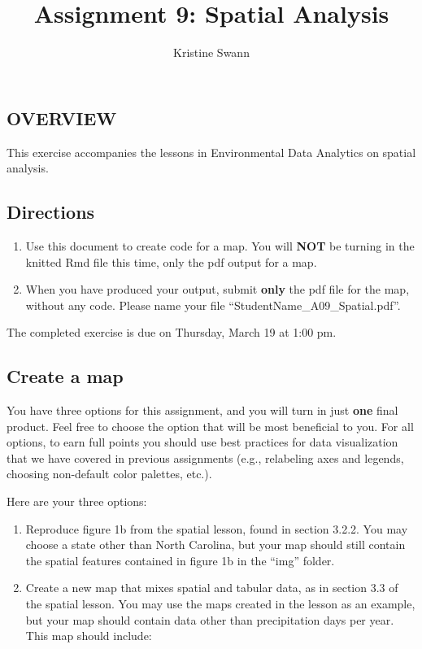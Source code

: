 \documentclass[
]{article}
\title{Assignment 9: Spatial Analysis}
\author{Kristine Swann}
\date{}
\providecommand{\tightlist}{%
  \setlength{\itemsep}{0pt}\setlength{\parskip}{0pt}}
\begin{document}
\maketitle

\hypertarget{overview}{%
\subsection{OVERVIEW}\label{overview}}

This exercise accompanies the lessons in Environmental Data Analytics on
spatial analysis.

\hypertarget{directions}{%
\subsection{Directions}\label{directions}}

\begin{enumerate}
\def\labelenumi{\arabic{enumi}.}
\tightlist
\item
  Use this document to create code for a map. You will \textbf{NOT} be
  turning in the knitted Rmd file this time, only the pdf output for a
  map.
\item
  When you have produced your output, submit \textbf{only} the pdf file
  for the map, without any code. Please name your file
  ``StudentName\_A09\_Spatial.pdf''.
\end{enumerate}

The completed exercise is due on Thursday, March 19 at 1:00 pm.

\hypertarget{create-a-map}{%
\subsection{Create a map}\label{create-a-map}}

You have three options for this assignment, and you will turn in just
\textbf{one} final product. Feel free to choose the option that will be
most beneficial to you. For all options, to earn full points you should
use best practices for data visualization that we have covered in
previous assignments (e.g., relabeling axes and legends, choosing
non-default color palettes, etc.).

Here are your three options:

\begin{enumerate}
\def\labelenumi{\arabic{enumi}.}
\item
  Reproduce figure 1b from the spatial lesson, found in section 3.2.2.
  You may choose a state other than North Carolina, but your map should
  still contain the spatial features contained in figure 1b in the
  ``img'' folder.
\item
  Create a new map that mixes spatial and tabular data, as in section
  3.3 of the spatial lesson. You may use the maps created in the lesson
  as an example, but your map should contain data other than
  precipitation days per year. This map should include:
\end{enumerate}
\end{document}
